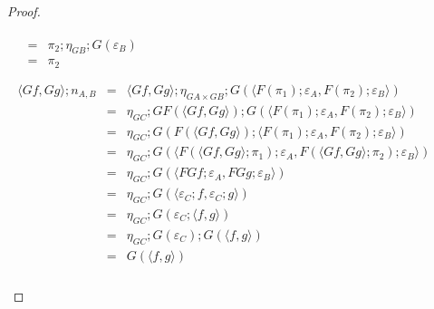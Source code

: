 \begin{proof}
\begin{center}
\begin{math}
\begin{array}{lll}
\begin{array}{lll}
          & = & \pi_2;\eta_{GB};G(\varepsilon_B)\\
          & = & \pi_2
        \end{array}
        \\\\
        \begin{array}{lll}
          \langle Gf, Gg\rangle;n_{A,B}
          & = & \langle Gf, Gg\rangle;\eta_{GA \times GB};G(\langle F(\pi_1);\varepsilon_A, F(\pi_2);\varepsilon_B \rangle)\\
          & = & \eta_{GC};GF(\langle Gf, Gg\rangle);G(\langle F(\pi_1);\varepsilon_A, F(\pi_2);\varepsilon_B \rangle)\\
          & = & \eta_{GC};G(F(\langle Gf, Gg\rangle);\langle F(\pi_1);\varepsilon_A, F(\pi_2);\varepsilon_B \rangle)\\
          & = & \eta_{GC};G(\langle F(\langle Gf, Gg\rangle;\pi_1);\varepsilon_A, F(\langle Gf, Gg\rangle;\pi_2);\varepsilon_B \rangle)\\
          & = & \eta_{GC};G(\langle FGf;\varepsilon_A, FGg;\varepsilon_B \rangle)\\
          & = & \eta_{GC};G(\langle \varepsilon_{C};f, \varepsilon_{C};g \rangle)\\
          & = & \eta_{GC};G(\varepsilon_{C};\langle f, g \rangle)\\
          & = & \eta_{GC};G(\varepsilon_{C});G(\langle f, g \rangle)\\
          & = & G(\langle f, g \rangle)\\
        \end{array}
      \end{array}
    \end{math}
  \end{center}


\end{proof}
